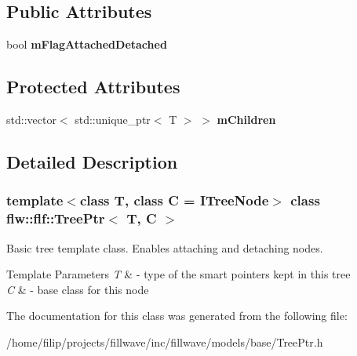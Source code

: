 \subsection*{Public Attributes}
\begin{DoxyCompactItemize}
\item 
\mbox{\label{classflw_1_1flf_1_1TreePtr_aa6c1d65eac91ccc16bd573db2cab3f95}} 
bool {\bfseries m\+Flag\+Attached\+Detached}
\end{DoxyCompactItemize}
\subsection*{Protected Attributes}
\begin{DoxyCompactItemize}
\item 
\mbox{\label{classflw_1_1flf_1_1TreePtr_a4f7344eab3e0ace889a3a80b42a78173}} 
std\+::vector$<$ std\+::unique\+\_\+ptr$<$ T $>$ $>$ {\bfseries m\+Children}
\end{DoxyCompactItemize}


\subsection{Detailed Description}
\subsubsection*{template$<$class T, class C = I\+Tree\+Node$>$\newline
class flw\+::flf\+::\+Tree\+Ptr$<$ T, C $>$}

Basic tree template class. Enables attaching and detaching nodes. 


\begin{DoxyTemplParams}{Template Parameters}
{\em T} & -\/ type of the smart pointers kept in this tree\\
\hline
{\em C} & -\/ base class for this node \\
\hline
\end{DoxyTemplParams}


The documentation for this class was generated from the following file\+:\begin{DoxyCompactItemize}
\item 
/home/filip/projects/fillwave/inc/fillwave/models/base/Tree\+Ptr.\+h\end{DoxyCompactItemize}
